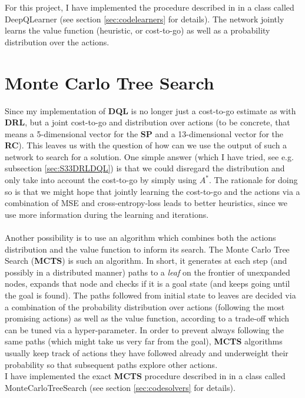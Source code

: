 For this project, I have implemented the procedure described in \cite{https://doi.org/10.48550/arxiv.1805.07470} in a class called DeepQLearner (see section \ref{sec:codelearners} for details). The network jointly learns the value function (heuristic, or cost-to-go) as well as a probability distribution over the actions.


\section{Monte Carlo Tree Search}

Since my implementation of \textbf{DQL} is no longer just a cost-to-go estimate as with \textbf{DRL}, but a joint cost-to-go and distribution over actions (to be concrete, that means a 5-dimensional vector for the \textbf{SP} and a 13-dimensional vector for the \textbf{RC}). This leaves us with the question of how can we use the output of such a network to search for a solution. One simple answer (which I have tried, see e.g. subsection \ref{sec:S33DRLDQL}) is that we could disregard the distribution and only take into account the cost-to-go by simply using $A^{*}$. The rationale for doing so is that we might hope that jointly learning the cost-to-go and the actions via a combination of MSE and cross-entropy-loss leads to better heuristics, since we use more information during the learning and iterations.
\\
\\
Another possibility is to use an algorithm which combines both the actions distribution and the value function to inform its search. The Monte Carlo Tree Search (\textbf{MCTS}) is such an algorithm. In short, it generates at each step (and possibly in a distributed manner) paths to a \textit{leaf} on the frontier of unexpanded nodes, expands that node and checks if it is a goal state (and keeps going until the goal is found). The paths followed from initial state to leaves are decided via a combination of the probability distribution over actions (following the most promising actions) as well as the value function, according to a trade-off which can be tuned via a hyper-parameter. In order to prevent always following the same paths (which might take us very far from the goal), \textbf{MCTS} algorithms usually keep track of actions they have followed already and underweight their probability so that subsequent paths explore other actions.
\\
I have implemented the exact \textbf{MCTS} procedure described in \cite{https://doi.org/10.48550/arxiv.1805.07470} in a class called MonteCarloTreeSearch (see section \ref{sec:codesolvers} for details).




































